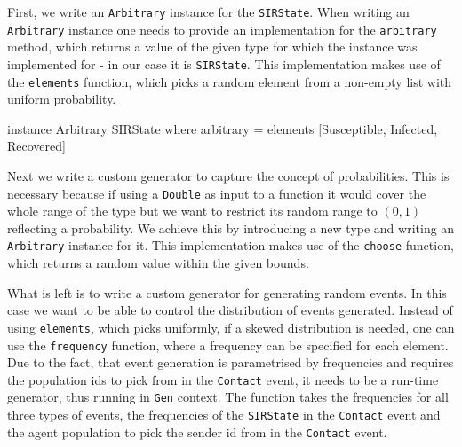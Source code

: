 First, we write an \texttt{Arbitrary} instance for the \texttt{SIRState}. When writing an \texttt{Arbitrary} instance one needs to provide an implementation for the \texttt{arbitrary} method, which returns a value of the given type for which the instance was implemented for - in our case it is \texttt{SIRState}. This implementation makes use of the \texttt{elements} function, which picks a random element from a non-empty list with uniform probability.

\begin{HaskellCode}
instance Arbitrary SIRState where
  arbitrary = elements [Susceptible, Infected, Recovered]
\end{HaskellCode}

Next we write a custom generator to capture the concept of probabilities. This is necessary because if using a \texttt{Double} as input to a function it would cover the whole range of the type but we want to restrict its random range to $(0,1)$ reflecting a probability. We achieve this by introducing a new type and writing an \texttt{Arbitrary} instance for it. This implementation makes use of the \texttt{choose} function, which returns a random value within the given bounds.


What is left is to write a custom generator for generating random events. In this case we want to be able to control the distribution of events generated. Instead of using \texttt{elements}, which picks uniformly, if a skewed distribution is needed, one can use the \texttt{frequency} function, where a frequency can be specified for each element. Due to the fact, that event generation is parametrised by frequencies and requires the population ids to pick from in the \texttt{Contact} event, it needs to be a run-time generator, thus running in \texttt{Gen} context. The function takes the frequencies for all three types of events, the frequencies of the \texttt{SIRState} in the \texttt{Contact} event and the agent population to pick the sender id from in the \texttt{Contact} event.

